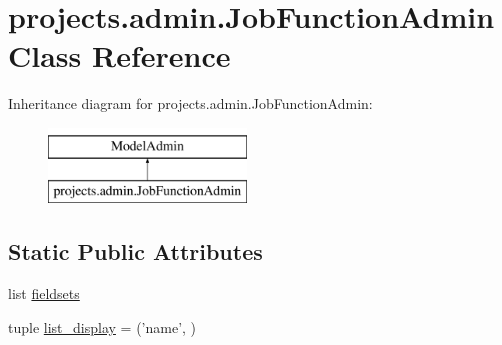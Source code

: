\hypertarget{classprojects_1_1admin_1_1_job_function_admin}{\section{projects.\-admin.\-Job\-Function\-Admin Class Reference}
\label{classprojects_1_1admin_1_1_job_function_admin}
}
Inheritance diagram for projects.\-admin.\-Job\-Function\-Admin\-:\begin{figure}[H]
\begin{center}
\leavevmode
\includegraphics[height=2.000000cm]{classprojects_1_1admin_1_1_job_function_admin}
\end{center}
\end{figure}
\subsection*{Static Public Attributes}
\begin{DoxyCompactItemize}
\item 
list \hyperlink{classprojects_1_1admin_1_1_job_function_admin_a279e262100369211b3f4de269e572396}{fieldsets}
\item 
tuple \hyperlink{classprojects_1_1admin_1_1_job_function_admin_a2177eff6bb8402018392a33ce3d8f1fd}{list\-\_\-display} = ('name', )
\end{DoxyCompactItemize}


